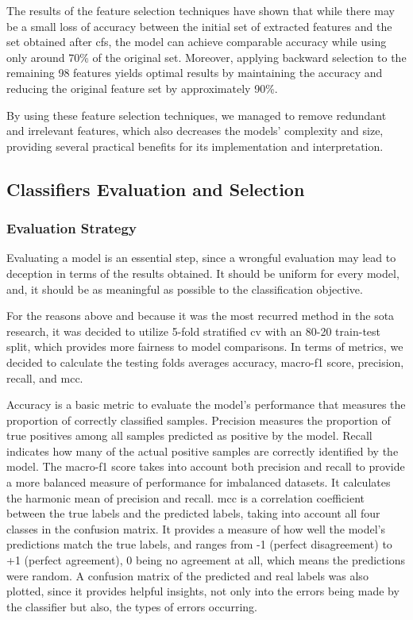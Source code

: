 The results of the feature selection techniques have shown that while there may be a small loss of accuracy between the initial set of extracted features and the set obtained after \ac{cfs}, the model can achieve comparable accuracy while using only around 70\% of the original set. Moreover, applying backward selection to the remaining 98 features yields optimal results by maintaining the accuracy and reducing the original feature set by approximately 90\%.

By using these feature selection techniques, we managed to remove redundant and irrelevant features, which also decreases the models' complexity and size, providing several practical benefits for its implementation and interpretation.


\subsection{Classifiers Evaluation and Selection}

\subsubsection{Evaluation Strategy}

Evaluating a model is an essential step, since a wrongful evaluation may lead to deception in terms of the results obtained. It should be uniform for every model, and, it should be as meaningful as possible to the classification objective.

For the reasons above and because it was the most recurred method in the \ac{sota} research, it was decided to utilize 5-fold stratified \ac{cv} with an 80-20 train-test split, which provides more fairness to model comparisons. In terms of metrics, we decided to calculate the testing folds averages accuracy, macro-f1 score, precision, recall, and \ac{mcc}.

Accuracy is a basic metric to evaluate the model's performance that measures the proportion of correctly classified samples. Precision measures the proportion of true positives among all samples predicted as positive by the model. Recall indicates how many of the actual positive samples are correctly identified by the model. The macro-f1 score takes into account both precision and recall to provide a more balanced measure of performance for imbalanced datasets. It calculates the harmonic mean of precision and recall. \ac{mcc} is a correlation coefficient between the true labels and the predicted labels, taking into account all four classes in the confusion matrix. It provides a measure of how well the model's predictions match the true labels, and ranges from -1 (perfect disagreement) to +1 (perfect agreement), 0 being no agreement at all, which means the predictions were random. A confusion matrix of the predicted and real labels was also plotted, since it provides helpful insights, not only into the errors being made by the classifier but also, the types of errors occurring.


